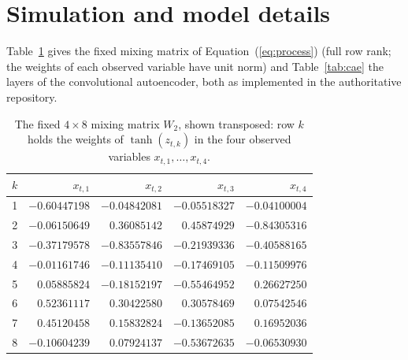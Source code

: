 \section{Simulation and model details}
\label{app:model}

Table~\ref{tab:w2} gives the fixed mixing matrix of Equation~(\ref{eq:process}) (full row rank; the
weights of each observed variable have unit norm) and Table~\ref{tab:cae} the layers of the
convolutional autoencoder, both as implemented in the authoritative repository.

\begin{table}[!ht]
\centering
\caption[The fixed mixing matrix]{The fixed $4\times8$ mixing matrix $W_2$, shown transposed: row $k$
holds the weights of $\tanh(z_{t,k})$ in the four observed variables $x_{t,1},\dots,x_{t,4}$.}
\label{tab:w2}
\begin{tabular}{crrrr}
\toprule
$k$ & $x_{t,1}$ & $x_{t,2}$ & $x_{t,3}$ & $x_{t,4}$ \\
\midrule
1 & $-0.60447198$ & $-0.04842081$ & $-0.05518327$ & $-0.04100004$ \\
2 & $-0.06150649$ & $0.36085142$ & $0.45874929$ & $-0.84305316$ \\
3 & $-0.37179578$ & $-0.83557846$ & $-0.21939336$ & $-0.40588165$ \\
4 & $-0.01161746$ & $-0.11135410$ & $-0.17469105$ & $-0.11509976$ \\
5 & $0.05885824$ & $-0.18152197$ & $-0.55464952$ & $0.26627250$ \\
6 & $0.52361117$ & $0.30422580$ & $0.30578469$ & $0.07542546$ \\
7 & $0.45120458$ & $0.15832824$ & $-0.13652085$ & $0.16952036$ \\
8 & $-0.10604239$ & $0.07924137$ & $-0.53672635$ & $-0.06530930$ \\
\bottomrule
\end{tabular}
\end{table}

